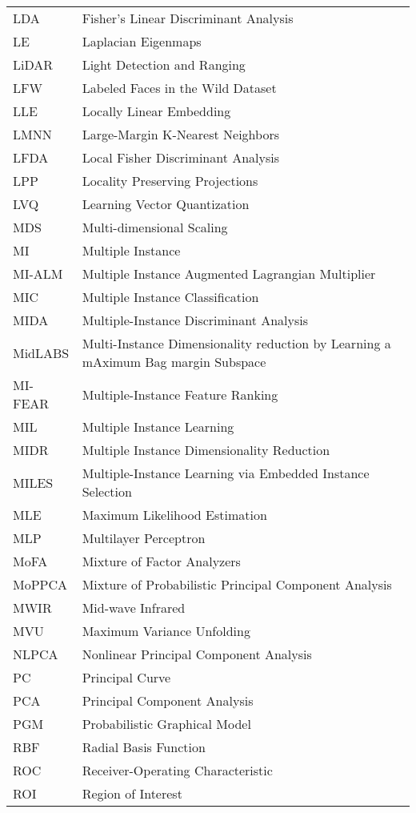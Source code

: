 \begin{longtable}{l p{5in}}
LDA & Fisher's Linear Discriminant Analysis\\
LE & Laplacian Eigenmaps\\
LiDAR & Light Detection and Ranging\\
LFW & Labeled Faces in the Wild Dataset\\
LLE & Locally Linear Embedding\\
LMNN & Large-Margin K-Nearest Neighbors\\
LFDA & Local Fisher Discriminant Analysis\\
LPP & Locality Preserving Projections\\
LVQ & Learning Vector Quantization\\
MDS & Multi-dimensional Scaling\\
MI & Multiple Instance\\
MI-ALM & Multiple Instance Augmented Lagrangian Multiplier\\
MIC & Multiple Instance Classification\\
MIDA & Multiple-Instance Discriminant Analysis\\
MidLABS & Multi-Instance Dimensionality reduction by Learning a mAximum Bag margin Subspace\\
MI-FEAR & Multiple-Instance Feature Ranking\\
MIL & Multiple Instance Learning\\
MIDR & Multiple Instance Dimensionality Reduction\\
MILES & Multiple-Instance Learning via Embedded Instance Selection\\
MLE & Maximum Likelihood Estimation\\
MLP & Multilayer Perceptron\\
MoFA & Mixture of Factor Analyzers\\
MoPPCA & Mixture of Probabilistic Principal Component Analysis\\
MWIR & Mid-wave Infrared\\
MVU & Maximum Variance Unfolding\\
NLPCA & Nonlinear Principal Component Analysis\\
PC & Principal Curve\\
PCA & Principal Component Analysis\\
PGM & Probabilistic Graphical Model\\
RBF & Radial Basis Function\\
ROC & Receiver-Operating Characteristic\\
ROI & Region of Interest\\

\end{longtable}
